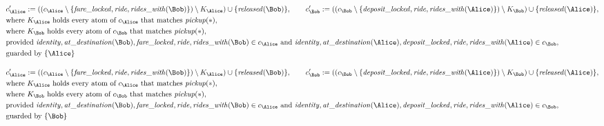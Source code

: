 \begin{align*}
&
c'_
{
\Alice
}
 := 
(
(c_
{
\Alice
}
 \setminus 
\{
\mathit{\detokenize{
fare_locked
}}
,
\mathit{\detokenize{
ride
}}
,
\mathit{\detokenize{
rides_with
}}
(
\Bob
)
\}
) \setminus K_
{
\Alice
}
) \cup 
\{
\mathit{\detokenize{
released
}}
(
\Bob
)
\}
, \qquad 
c'_
{
\Bob
}
 := 
(
(c_
{
\Bob
}
 \setminus 
\{
\mathit{\detokenize{
deposit_locked
}}
,
\mathit{\detokenize{
ride
}}
,
\mathit{\detokenize{
rides_with
}}
(
\Alice
)
\}
) \setminus K_
{
\Bob
}
) \cup 
\{
\mathit{\detokenize{
released
}}
(
\Alice
)
\}
,\\
&
\text{where } K_
{
\Alice
}
 \text{ holds every atom of } c_
{
\Alice
}
 \text{ that matches } 
\mathit{\detokenize{
pickup
}}
(
\ast
)
,\\
&
\text{where } K_
{
\Bob
}
 \text{ holds every atom of } c_
{
\Bob
}
 \text{ that matches } 
\mathit{\detokenize{
pickup
}}
(
\ast
)
,\\
&
\text{provided } 
\mathit{\detokenize{
identity
}}
,
\mathit{\detokenize{
at_destination
}}
(
\Bob
)
,
\mathit{\detokenize{
fare_locked
}}
,
\mathit{\detokenize{
ride
}}
,
\mathit{\detokenize{
rides_with
}}
(
\Bob
)
 \in c_
{
\Alice
}
 \text{ and } 
\mathit{\detokenize{
identity
}}
,
\mathit{\detokenize{
at_destination
}}
(
\Alice
)
,
\mathit{\detokenize{
deposit_locked
}}
,
\mathit{\detokenize{
ride
}}
,
\mathit{\detokenize{
rides_with
}}
(
\Alice
)
 \in c_
{
\Bob
}
,\\
&
\text{guarded by } \{
\Alice
\}
\end{align*}

\begin{align*}
&
c'_
{
\Alice
}
 := 
(
(c_
{
\Alice
}
 \setminus 
\{
\mathit{\detokenize{
fare_locked
}}
,
\mathit{\detokenize{
ride
}}
,
\mathit{\detokenize{
rides_with
}}
(
\Bob
)
\}
) \setminus K_
{
\Alice
}
) \cup 
\{
\mathit{\detokenize{
released
}}
(
\Bob
)
\}
, \qquad 
c'_
{
\Bob
}
 := 
(
(c_
{
\Bob
}
 \setminus 
\{
\mathit{\detokenize{
deposit_locked
}}
,
\mathit{\detokenize{
ride
}}
,
\mathit{\detokenize{
rides_with
}}
(
\Alice
)
\}
) \setminus K_
{
\Bob
}
) \cup 
\{
\mathit{\detokenize{
released
}}
(
\Alice
)
\}
,\\
&
\text{where } K_
{
\Alice
}
 \text{ holds every atom of } c_
{
\Alice
}
 \text{ that matches } 
\mathit{\detokenize{
pickup
}}
(
\ast
)
,\\
&
\text{where } K_
{
\Bob
}
 \text{ holds every atom of } c_
{
\Bob
}
 \text{ that matches } 
\mathit{\detokenize{
pickup
}}
(
\ast
)
,\\
&
\text{provided } 
\mathit{\detokenize{
identity
}}
,
\mathit{\detokenize{
at_destination
}}
(
\Bob
)
,
\mathit{\detokenize{
fare_locked
}}
,
\mathit{\detokenize{
ride
}}
,
\mathit{\detokenize{
rides_with
}}
(
\Bob
)
 \in c_
{
\Alice
}
 \text{ and } 
\mathit{\detokenize{
identity
}}
,
\mathit{\detokenize{
at_destination
}}
(
\Alice
)
,
\mathit{\detokenize{
deposit_locked
}}
,
\mathit{\detokenize{
ride
}}
,
\mathit{\detokenize{
rides_with
}}
(
\Alice
)
 \in c_
{
\Bob
}
,\\
&
\text{guarded by } \{
\Bob
\}
\end{align*}
